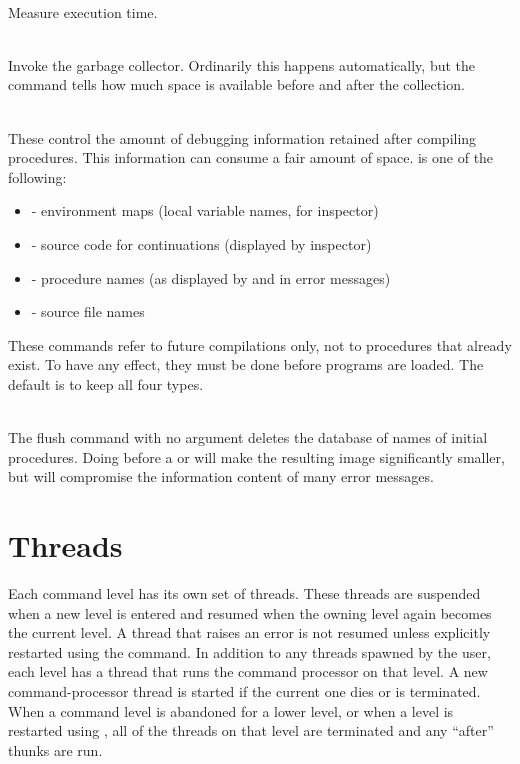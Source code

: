 \begin{description}
\item {}\\
    Measure execution time.

\item {}\\
    Invoke the garbage collector.  Ordinarily this happens
    automatically, but the command tells how much space is available
    before and after the collection.

\item {}
\T\vspace{-1em}
\item {}\\
    These control the amount of debugging information retained after
    compiling procedures.  This information can consume a fair amount
    of space.   is one of the following:
\begin{itemize}
\item {} - environment maps (local variable names, for inspector)
\item {} - source code for continuations (displayed by inspector)
\item {} - procedure names (as displayed by  and in error
       messages)
\item {}  - source file names
\end{itemize}
    These commands refer to future compilations only, not to procedures
    that already exist.  To have any effect, they must be done before
    programs are loaded.  The default is to keep all four types.

\item {}\\
    The flush command with no argument deletes the database of names
    of initial procedures.  Doing  before a  or
    will make the resulting image significantly smaller, but will
    compromise the information content of many error
    messages.
\end{description}

\section{Threads}

Each command level has its own set of threads.  These threads are suspended
 when a new level is entered and resumed when the owning level again becomes
 the current level.
A thread that raises an error is not resumed unless
 explicitly restarted using the  command.
In addition to any threads spawned by the user, each level has a thread
 that runs the command processor on that level.
A new command-processor thread is started if the current one
 dies or is terminated.
When a command level is abandoned for a lower level, or when
 a level is restarted using , all of the threads on that
 level are terminated and any  ``after'' thunks are run.

